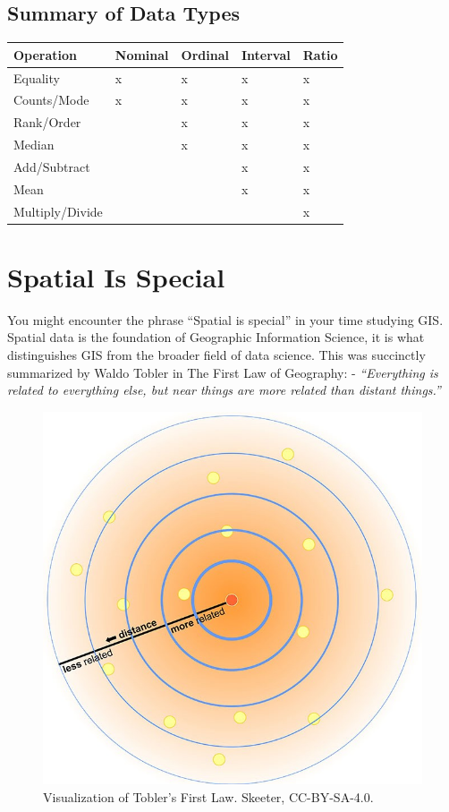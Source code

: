 \documentclass[
]{book}
\begin{document}
\subsection{Summary of Data Types}\label{summary-of-data-types}

\begin{longtable}[]{@{}lllll@{}}
\toprule\noalign{}
Operation & Nominal & Ordinal & Interval & Ratio \\
\midrule\noalign{}
\endhead
\bottomrule\noalign{}
\endlastfoot
Equality & x & x & x & x \\
Counts/Mode & x & x & x & x \\
Rank/Order & & x & x & x \\
Median & & x & x & x \\
Add/Subtract & & & x & x \\
Mean & & & x & x \\
Multiply/Divide & & & & x \\
\end{longtable}

\section{Spatial Is Special}\label{spatial-is-special}

You might encounter the phrase ``Spatial is special'' in your time studying GIS. Spatial data is the foundation of Geographic Information Science, it is what distinguishes GIS from the broader field of data science. This was succinctly summarized by Waldo Tobler in The First Law of Geography:
- \emph{``Everything is related to everything else, but near things are more related than distant things.''}

\begin{figure}
\includegraphics[width=0.75\linewidth]{images/03-spatial-is-special} \caption{Visualization of Tobler's First Law. Skeeter, CC-BY-SA-4.0.}\label{fig:3-spatial-is-special}
\end{figure}
\end{document}
